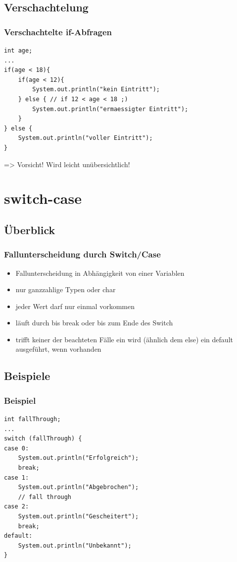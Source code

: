 \documentclass[final]{beamer}
\begin{document}
\subsection{Verschachtelung}
\begin{frame}[containsverbatim]
	\frametitle{Verschachtelte if-Abfragen}
	\begin{lstlisting}
int age;
...
if(age < 18){
	if(age < 12){
		System.out.println("kein Eintritt");
	} else { // if 12 < age < 18 ;)
		System.out.println("ermaessigter Eintritt");
	}
} else {
	System.out.println("voller Eintritt");
}
	\end{lstlisting}
	=> Vorsicht! Wird leicht unübersichtlich!
\end{frame}

\section{switch-case}
\subsection{Überblick}
\begin{frame}[containsverbatim]
	\frametitle{Fallunterscheidung durch Switch/Case}
	\begin{itemize}
		\item{Fallunterscheidung in Abhängigkeit von einer Variablen}
		\item{nur ganzzahlige Typen oder char}
		\item{jeder Wert darf nur einmal vorkommen}
		\item{läuft durch bis break oder bis zum Ende des Switch}
		\item{trifft keiner der beachteten Fälle ein wird (ähnlich dem else) ein default ausgeführt, wenn vorhanden}
	\end{itemize}
\end{frame}


\subsection{Beispiele}
\begin{frame}[containsverbatim]
	\frametitle{Beispiel}
	\begin{lstlisting}
int fallThrough;
...
switch (fallThrough) {
case 0:
	System.out.println("Erfolgreich");
	break;
case 1:
	System.out.println("Abgebrochen");
	// fall through
case 2:
	System.out.println("Gescheitert");
	break;
default:
	System.out.println("Unbekannt");
}
	\end{lstlisting}
\end{frame}
\end{document}
